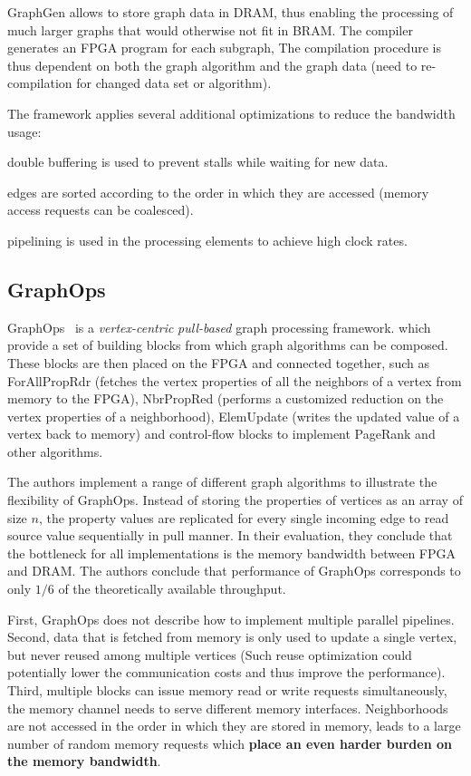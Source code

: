 \documentclass[UTF8,12pt,a4paper]{article}
\begin{document}
GraphGen allows to store graph data in DRAM,
thus enabling the processing of much larger graphs that would otherwise not fit in BRAM.
The compiler generates an FPGA program for each subgraph,
The compilation procedure is thus dependent
on both the graph algorithm and the graph data
(need to re-compilation for changed data set or algorithm).

The framework applies several additional optimizations to reduce the bandwidth usage:
\begin{compactitem}
  \item double buffering is used to prevent stalls while waiting for new data.
  \item edges are sorted according to the order in which they are accessed
  (memory access requests can be coalesced).
  \item pipelining is used in the processing elements to achieve high clock rates.
\end{compactitem}

\subsection{GraphOps}
GraphOps~\cite{DBLP:conf/fpga/OguntebiO16}
is a \textit{vertex-centric} \textit{pull-based} graph processing framework.
which provide a set of building blocks from which graph algorithms can be composed.
These blocks are then placed on the FPGA and connected together,
such as
ForAllPropRdr
(fetches the vertex properties of all the neighbors of a vertex from memory to the FPGA),
NbrPropRed
(performs a customized reduction on the vertex properties of a neighborhood),
ElemUpdate
(writes the updated value of a vertex back to memory)
and control-flow blocks
to implement PageRank and other algorithms.

The authors implement a range of different graph algorithms
to illustrate the flexibility of GraphOps.
Instead of storing the properties of vertices as an array of size $n$,
the property values are replicated for every single incoming edge
to read source value sequentially in pull manner.
In their evaluation, they conclude that the bottleneck for all implementations
is the memory bandwidth between FPGA and DRAM.
The authors conclude that performance of GraphOps
corresponds to only $1/6$ of the theoretically available throughput.

First, GraphOps does not describe how to implement multiple parallel pipelines.
Second, data that is fetched from memory is only used to update a single vertex,
but never reused among multiple vertices (Such reuse optimization could potentially
lower the communication costs and thus improve the performance).
Third, multiple blocks can issue memory read or write requests simultaneously,
the memory channel needs to serve different memory interfaces.
Neighborhoods are not accessed in the order in which they are stored in memory,
leads to a large number of random memory requests which \textbf{place an even harder burden on the memory bandwidth}.
\end{document}
